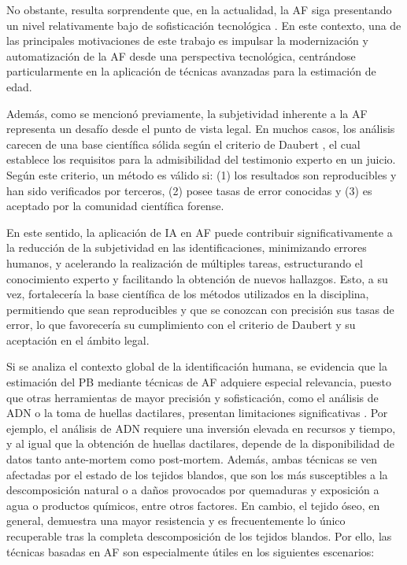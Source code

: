 No obstante, resulta sorprendente que, en la actualidad, la AF siga presentando un nivel relativamente bajo de sofisticación tecnológica \cite{RefWorks:RefID:21-mesejo2020survey}. En este contexto, una de las principales motivaciones de este trabajo es impulsar la modernización y automatización de la AF desde una perspectiva tecnológica, centrándose particularmente en la aplicación de técnicas avanzadas para la estimación de edad.

Además, como se mencionó previamente, la subjetividad inherente a la AF representa un desafío desde el punto de vista legal. En muchos casos, los análisis carecen de una base científica sólida según el criterio de Daubert \cite{noauthor_daubert_nodate}, el cual establece los requisitos para la admisibilidad del testimonio experto en un juicio. Según este criterio, un método es válido si: (1) los resultados son reproducibles y han sido verificados por terceros, (2) posee tasas de error conocidas y (3) es aceptado por la comunidad científica forense.

En este sentido, la aplicación de IA en AF puede contribuir significativamente a la reducción de la subjetividad en las identificaciones, minimizando errores humanos, y acelerando la realización de múltiples tareas, estructurando el conocimiento experto y facilitando la obtención de nuevos hallazgos. Esto, a su vez, fortalecería la base científica de los métodos utilizados en la disciplina, permitiendo que sean reproducibles y que se conozcan con precisión sus tasas de error, lo que favorecería su cumplimiento con el criterio de Daubert y su aceptación en el ámbito legal.

Si se analiza el contexto global de la identificación humana, se evidencia que la estimación del PB mediante técnicas de AF adquiere especial relevancia, puesto que otras herramientas de mayor precisión y sofisticación, como el análisis de ADN o la toma de huellas dactilares, presentan limitaciones significativas \cite{de_boer_role_2019, beauthier_mass_2009}. Por ejemplo, el análisis de ADN requiere una inversión elevada en recursos y tiempo, y al igual que la obtención de huellas dactilares, depende de la disponibilidad de datos tanto ante-mortem como post-mortem. Además, ambas técnicas se ven afectadas por el estado de los tejidos blandos, que son los más susceptibles a la descomposición natural o a daños provocados por quemaduras y exposición a agua o productos químicos, entre otros factores. En cambio, el tejido óseo, en general, demuestra una mayor resistencia y es frecuentemente lo único recuperable tras la completa descomposición de los tejidos blandos. Por ello, las técnicas basadas en AF son especialmente útiles en los siguientes escenarios:

